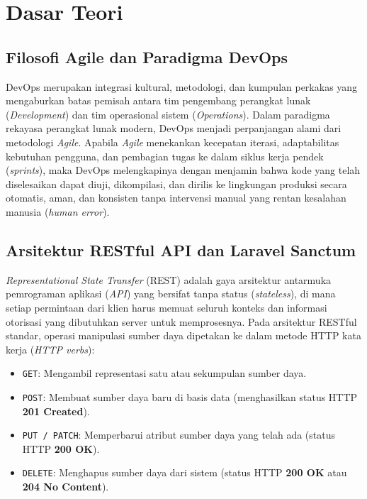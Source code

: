 \documentclass[a4paper,oneside,11pt]{book}
\begin{document}
\chapter{Dasar Teori}

\section{Filosofi Agile dan Paradigma DevOps}
DevOps merupakan integrasi kultural, metodologi, dan kumpulan perkakas yang mengaburkan batas pemisah antara tim pengembang perangkat lunak (\textit{Development}) dan tim operasional sistem (\textit{Operations}). Dalam paradigma rekayasa perangkat lunak modern, DevOps menjadi perpanjangan alami dari metodologi \textit{Agile}. Apabila \textit{Agile} menekankan kecepatan iterasi, adaptabilitas kebutuhan pengguna, dan pembagian tugas ke dalam siklus kerja pendek (\textit{sprints}), maka DevOps melengkapinya dengan menjamin bahwa kode yang telah diselesaikan dapat diuji, dikompilasi, dan dirilis ke lingkungan produksi secara otomatis, aman, dan konsisten tanpa intervensi manual yang rentan kesalahan manusia (\textit{human error}).

\section{Arsitektur RESTful API dan Laravel Sanctum}
\textit{Representational State Transfer} (REST) adalah gaya arsitektur antarmuka pemrograman aplikasi (\textit{API}) yang bersifat tanpa status (\textit{stateless}), di mana setiap permintaan dari klien harus memuat seluruh konteks dan informasi otorisasi yang dibutuhkan server untuk memprosesnya. Pada arsitektur RESTful standar, operasi manipulasi sumber daya dipetakan ke dalam metode HTTP kata kerja (\textit{HTTP verbs}):
\begin{itemize}
\item \texttt{GET}: Mengambil representasi satu atau sekumpulan sumber daya.
\item \texttt{POST}: Membuat sumber daya baru di basis data (menghasilkan status HTTP \textbf{201 Created}).
\item \texttt{PUT / PATCH}: Memperbarui atribut sumber daya yang telah ada (status HTTP \textbf{200 OK}).
\item \texttt{DELETE}: Menghapus sumber daya dari sistem (status HTTP \textbf{200 OK} atau \textbf{204 No Content}).
\end{itemize}
\end{document}
